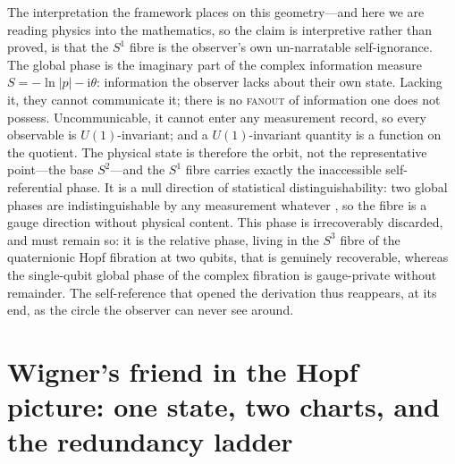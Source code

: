 \documentclass{article}
\begin{document}
The interpretation the framework places on this geometry---and here we are
reading physics into the mathematics, so the claim is interpretive rather than
proved, is that the $S^{1}$ fibre is the observer's own un-narratable
self-ignorance. The global phase is the imaginary part of the complex information
measure $S=-\ln\lvert p\rvert-\mathrm{i}\theta$: information the observer lacks
about their own state. Lacking it, they cannot communicate it; there is no
\textsc{fanout} of information one does not possess. Uncommunicable, it cannot
enter any measurement record, so every observable is $U(1)$-invariant; and a
$U(1)$-invariant quantity is a function on the quotient. The physical state is
therefore the orbit, not the representative point---the base $S^{2}$---and the
$S^{1}$ fibre carries exactly the inaccessible self-referential phase. It is a
null direction of statistical distinguishability: two global phases are
indistinguishable by any measurement whatever \autocite{wooters_1981}, so the fibre is a gauge direction without physical content. This phase is irrecoverably
discarded, and must remain so: it is the relative phase, living in the $S^{3}$
fibre of the quaternionic Hopf fibration at two qubits, that is genuinely
recoverable, whereas the single-qubit global phase of the complex fibration is
gauge-private without remainder. The self-reference that opened the derivation
thus reappears, at its end, as the circle the observer can never see around.

\section{Wigner's friend in the Hopf picture: one state, two charts, and the redundancy ladder}
\label{sec:wigners-friend}
\end{document}
